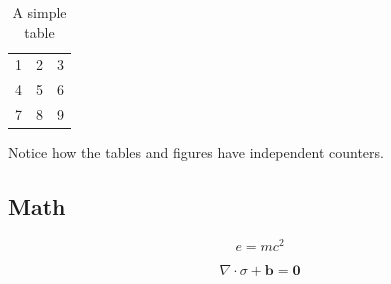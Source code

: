 \documentclass[11pt,a4paper]{article}
\begin{document}
        \begin{table}
          \centering
            \begin{tabular}{| l c r |}
            \hline
            1 & 2 & 3 \\
            4 & 5 & 6 \\
            7 & 8 & 9 \\
            \hline
            \end{tabular}
          \caption{A simple table}
        \end{table}

        Notice how the tables and figures have independent counters.

    \subsection{Math}

        \begin{equation}
            e = mc^2
        \end{equation}

        \begin{equation}
            \nabla \cdot \sigma + \mathbf{b} = \mathbf{0}
        \end{equation}
\end{document}
